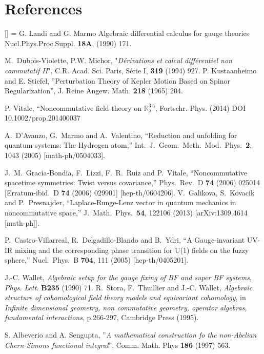 \documentclass[a4paper,11pt]{article}
\numberwithin{equation}{section}
\newcommand\Rl{\mathbb{R}^3_\lambda}
\renewenvironment{thebibliography}[1]
         {\section*{References}\frenchspacing\small
          \begin{list}{[\arabic{enumi}]}
         {\usecounter{enumi}\parsep=2pt\topsep 0pt
         \settowidth{\labelwidth}{[#1]}
         \leftmargin=\labelwidth\advance\leftmargin\labelsep
         \rightmargin=0pt\itemsep=1pt\sloppy}}{\end{list}}
\theoremstyle{nonumberplain}
\begin{document}
\begin{thebibliography}{50}
  G. Landi and G. Marmo Algebraic differential calculus for gauge theories
Nucl.Phys.Proc.Suppl. {\bf   18A}, (1990) 171.

 M.~Dubois-Violette, P.W. Michor, "{\it{D\'erivations et calcul diff\'erentiel non commutatif II}}", C.R. Acad. Sci. Paris, S\'erie I, {\bf{319}} 
(1994) 927.
  P. Kustaanheimo and E. Stiefel, ''Perturbation Theory of
Kepler Motion Based on Spinor Regularization'',  J. Reine Angew. Math. {\bf 218} (1965) 204.

 P.  Vitale,  ``Noncommutative field theory on $\Rl$'', Fortschr. Phys. (2014) DOI 10.1002/prop.201400037

 A.~D'Avanzo, G.~Marmo and A.~Valentino,
  ``Reduction and unfolding for quantum systems: The Hydrogen atom,''
  Int.\ J.\ Geom.\ Meth.\ Mod.\ Phys.\  {\bf 2}, 1043 (2005)
  [math-ph/0504033].
 
   J.~M.~Gracia-Bondia, F.~Lizzi, F.~R.~Ruiz and P.~Vitale,
  ``Noncommutative spacetime symmetries: Twist versus covariance,''
  Phys.\ Rev.\ D {\bf 74} (2006) 025014
   [Erratum-ibid.\ D {\bf 74} (2006) 029901]
  [hep-th/0604206].
  V.~Galikova, S.~Kovacik and P.~Presnajder,
  ``Laplace-Runge-Lenz vector in quantum mechanics in noncommutative space,''
  J.\ Math.\ Phys.\  {\bf 54}, 122106 (2013)
  [arXiv:1309.4614 [math-ph]].
  
  P.~Castro-Villarreal, R.~Delgadillo-Blando and B.~Ydri,
  ``A Gauge-invariant UV-IR mixing and the corresponding phase transition for U(1) fields on the fuzzy sphere,''
  Nucl.\ Phys.\ B {\bf 704}, 111 (2005)
  [hep-th/0405201].
  
  J.-C. Wallet, \textit{Algebraic setup for the gauge fixing of {BF} and super
  {BF} systems}, \textit{Phys. Lett.} \textbf{B235} (1990) 71. 
R.~Stora, F.~Thuillier and J.-C. Wallet, \textit{{Algebraic structure of
  cohomological field theory models and equivariant cohomology}}, {in
  \textit{Infinite dimensional geometry, non commutative geometry, operator
  algebras, fundamental interactions}, p.266-297, Cambridge Press (1995)}.

 S. Albeverio and A. Sengupta, ''{\it{A mathematical construction fo the non-Abelian Chern-Simons functional integral}}'', Comm. Math. Phys {\bf{186}} (1997) 563. 


\end{thebibliography}
\end{document}
